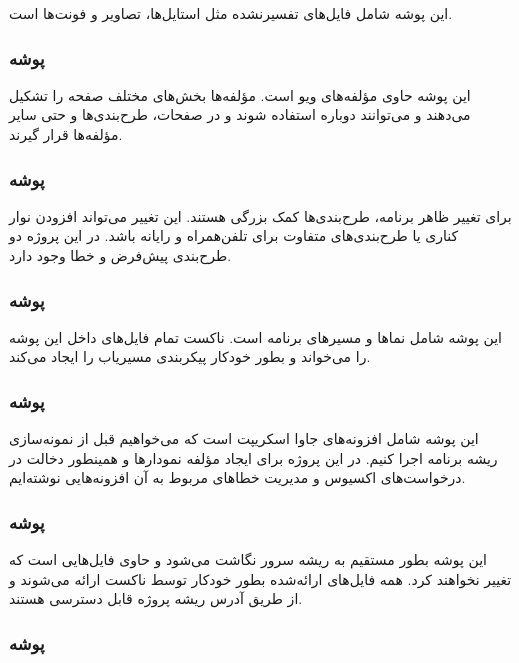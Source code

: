 این پوشه شامل فایل‌های تفسیرنشده مثل استایل‌ها، تصاویر و فونت‌ها است\cite{nuxt}.

\subsubsection{پوشه }

این پوشه حاوی مؤلفه‌های ویو است. مؤلفه‌ها بخش‌های مختلف صفحه را تشکیل می‌دهند و می‌توانند دوباره استفاده شوند و در صفحات، طرح‌بندی‌ها و حتی سایر مؤلفه‌ها قرار گیرند\cite{nuxt}.

\subsubsection{پوشه }

برای تغییر ظاهر برنامه، طرح‌بندی‌ها کمک بزرگی هستند. این تغییر می‌تواند افزودن نوار کناری یا طرح‌بندی‌های متفاوت برای تلفن‌همراه و رایانه باشد. در این پروژه دو طرح‌بندی پیش‌فرض و خطا وجود دارد\cite{nuxt}.

\subsubsection{پوشه }

این پوشه شامل نماها و مسیرهای برنامه است. ناکست تمام فایل‌های  داخل این پوشه را می‌خواند و بطور خودکار پیکربندی مسیریاب را ایجاد می‌کند\cite{nuxt}.

\subsubsection{پوشه }

این پوشه شامل افزونه‌های جاوا اسکریپت است که می‌خواهیم قبل از نمونه‌سازی ریشه برنامه اجرا کنیم\cite{nuxt}. در این پروژه برای ایجاد مؤلفه نمودارها و همینطور دخالت در درخواست‌های اکسیوس و مدیریت خطاهای مربوط به آن افزونه‌هایی نوشته‌ایم.

\subsubsection{پوشه }

این پوشه بطور مستقیم به ریشه سرور نگاشت می‌شود و حاوی فایل‌هایی است که تغییر نخواهند کرد. همه فایل‌های ارائه‌شده بطور خودکار توسط ناکست ارائه می‌شوند و از طریق آدرس ریشه پروژه قابل دسترسی هستند\cite{nuxt}.

\subsubsection{پوشه }

